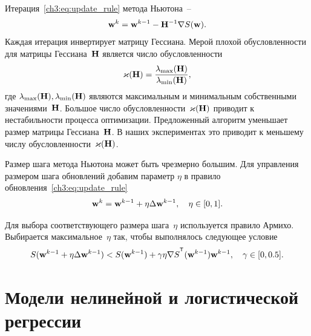 Итерация~\eqref{ch3:eq:update_rule} метода Ньютона~--
\[
\mathbf{w}^k = \mathbf{w}^{k-1} - \mathbf{H}^{-1} \nabla S(\mathbf{w}).
\]
Каждая итерация инвертирует матрицу Гессиана.
Мерой плохой обусловленности для матрицы Гессиана~$\mathbf{H}$ является число обусловленности
\[
\varkappa(\mathbf{H}) = \frac{\lambda_{\text{max}}(\mathbf{H})}{\lambda_{\text{min}}(\mathbf{H})},
\]
где $\lambda_{\text{max}}(\mathbf{H}), \lambda_{\text{min}}(\mathbf{H})$ являются максимальным и минимальным собственными значениями~$\mathbf{H}$. Большое число обусловленности~$\varkappa (\mathbf{H})$ приводит к нестабильности процесса оптимизации.
Предложенный алгоритм уменьшает размер матрицы Гессиана~$\mathbf{H}$. В наших экспериментах это приводит к меньшему числу обусловленности~$\varkappa (\mathbf{H})$.

Размер шага метода Ньютона может быть чрезмерно большим. Для управления размером шага обновлений добавим параметр $\eta$ в правило обновления~\eqref{ch3:eq:update_rule}
\[
\mathbf{w}^k = \mathbf{w}^{k - 1} + \eta \Delta \mathbf{w}^{k - 1}, \quad \eta \in [0, 1].
\]

Для выбора соответствующего размера шага~$\eta$ используется правило Армихо. Выбирается максимальное~$\eta$ так, чтобы выполнялось следующее условие
\[
S(\bw^{k - 1} + \eta \Delta \bw^{k - 1}) < S(\bw^{k - 1}) + \gamma \eta \nabla S^{\T}(\bw^{k-1})\bw^{k - 1}, \quad \gamma \in [0, 0.5].
\]

\section{Модели нелинейной и логистической регрессии}

